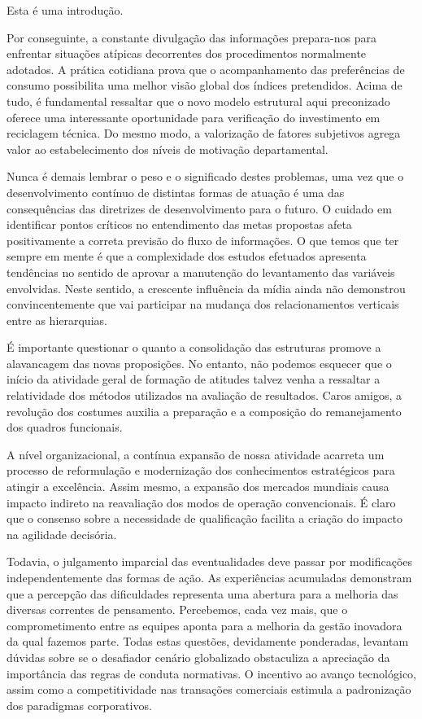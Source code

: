 Esta é uma introdução. 

Por conseguinte, a constante divulgação das informações prepara-nos para enfrentar situações atípicas decorrentes dos procedimentos normalmente adotados. A prática cotidiana prova que o acompanhamento das preferências de consumo possibilita uma melhor visão global dos índices pretendidos. Acima de tudo, é fundamental ressaltar que o novo modelo estrutural aqui preconizado oferece uma interessante oportunidade para verificação do investimento em reciclagem técnica. Do mesmo modo, a valorização de fatores subjetivos agrega valor ao estabelecimento dos níveis de motivação departamental.

Nunca é demais lembrar o peso e o significado destes problemas, uma vez que o desenvolvimento contínuo de distintas formas de atuação é uma das consequências das diretrizes de desenvolvimento para o futuro. O cuidado em identificar pontos críticos no entendimento das metas propostas afeta positivamente a correta previsão do fluxo de informações. O que temos que ter sempre em mente é que a complexidade dos estudos efetuados apresenta tendências no sentido de aprovar a manutenção do levantamento das variáveis envolvidas. Neste sentido, a crescente influência da mídia ainda não demonstrou convincentemente que vai participar na mudança dos relacionamentos verticais entre as hierarquias.

É importante questionar o quanto a consolidação das estruturas promove a alavancagem das novas proposições. No entanto, não podemos esquecer que o início da atividade geral de formação de atitudes talvez venha a ressaltar a relatividade dos métodos utilizados na avaliação de resultados. Caros amigos, a revolução dos costumes auxilia a preparação e a composição do remanejamento dos quadros funcionais.

A nível organizacional, a contínua expansão de nossa atividade acarreta um processo de reformulação e modernização dos conhecimentos estratégicos para atingir a excelência. Assim mesmo, a expansão dos mercados mundiais causa impacto indireto na reavaliação dos modos de operação convencionais. É claro que o consenso sobre a necessidade de qualificação facilita a criação do impacto na agilidade decisória.

Todavia, o julgamento imparcial das eventualidades deve passar por modificações independentemente das formas de ação. As experiências acumuladas demonstram que a percepção das dificuldades representa uma abertura para a melhoria das diversas correntes de pensamento. Percebemos, cada vez mais, que o comprometimento entre as equipes aponta para a melhoria da gestão inovadora da qual fazemos parte. Todas estas questões, devidamente ponderadas, levantam dúvidas sobre se o desafiador cenário globalizado obstaculiza a apreciação da importância das regras de conduta normativas. O incentivo ao avanço tecnológico, assim como a competitividade nas transações comerciais estimula a padronização dos paradigmas corporativos. 
